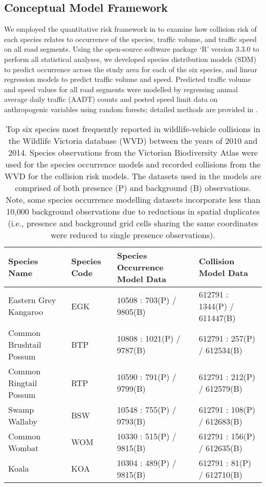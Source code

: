 \subsection{Conceptual Model Framework}

We employed the quantitative risk framework in  to examine how collision risk of each species relates to occurrence of the species, traffic volume, and traffic speed on all road segments. Using the open-source software package `R' version 3.3.0 \citep{rdct16} to perform all statistical analyses, we developed species distribution models (SDM) to predict occurrence across the study area for each of the six species, and linear regression models to predict traffic volume and speed. Predicted traffic volume and speed values for all road segments were modelled by regressing annual average daily traffic (AADT) counts and posted speed limit data on anthropogenic variables using random forests; detailed methods are provided in . 

\begin{table}[htp]
\caption[Six mammal species most frequently reported in wildlife-vehicle collisions]{Top six species most frequently reported in wildlife-vehicle collisions in the Wildlife Victoria database (WVD) between the years of 2010 and 2014. Species observations from the Victorian Biodiversity Atlas were used for the species occurrence models and recorded collisions from the WVD for the collision risk models. The datasets used in the models are comprised of both presence (P) and background (B) observations. Note, some species occurrence modelling datasets incorporate less than 10,000 background observations due to reductions in spatial duplicates (i.e., presence and background grid cells sharing the same coordinates were reduced to single presence observations).}
\centering
\begin{tabularx}{0.9\textwidth}{llll} \toprule
Species Name                     &Species Code     &Species Occurrence Model Data     &Collision Model Data \\ \midrule 
Eastern Grey Kangaroo 	& EGK	& 10508 : 703(P) / 9805(B) 	& 612791 : 1344(P) / 611447(B) \\ 
Common Brushtail Possum & BTP	& 10808 : 1021(P) / 9787(B)	& 612791 : 257(P) / 612534(B) \\ 
Common Ringtail Possum 	& RTP	& 10590 : 791(P) / 9799(B)	& 612791 : 212(P) / 612579(B) \\ 
Swamp Wallaby		 	& BSW	& 10548 : 755(P) / 9793(B) 	& 612791 : 108(P) / 612683(B) \\ 
Common Wombat 			& WOM	& 10330 : 515(P) / 9815(B) 	& 612791 : 156(P) / 612635(B) \\ 
Koala 					& KOA 	& 10304 : 489(P) / 9815(B) 	& 612791 : 81(P) / 612710(B) \\ 
\bottomrule
\end{tabularx}
\label{6sp_species_data}
\end{table}

